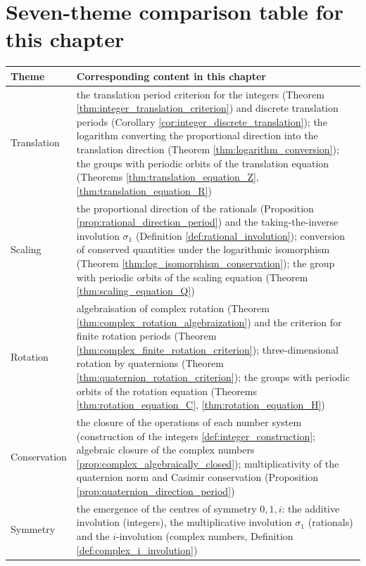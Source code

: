 \section*{Seven-theme comparison table for this chapter}

\begingroup
\renewcommand{\arraystretch}{1.3}
\begin{longtable}{>{\raggedright\arraybackslash}p{3cm}>{\raggedright\arraybackslash}p{10.5cm}}
\toprule
Theme & Corresponding content in this chapter \\
\midrule
Translation & the translation period criterion for the integers (Theorem \ref{thm:integer_translation_criterion}) and discrete translation periods (Corollary \ref{cor:integer_discrete_translation}); the logarithm converting the proportional direction into the translation direction (Theorem \ref{thm:logarithm_conversion}); the groups with periodic orbits of the translation equation (Theorems \ref{thm:translation_equation_Z}, \ref{thm:translation_equation_R}) \\
Scaling & the proportional direction of the rationals (Proposition \ref{prop:rational_direction_period}) and the taking-the-inverse involution $\sigma_1$ (Definition \ref{def:rational_involution}); conversion of conserved quantities under the logarithmic isomorphism (Theorem \ref{thm:log_isomorphism_conservation}); the group with periodic orbits of the scaling equation (Theorem \ref{thm:scaling_equation_Q}) \\
Rotation & algebraisation of complex rotation (Theorem \ref{thm:complex_rotation_algebraization}) and the criterion for finite rotation periods (Theorem \ref{thm:complex_finite_rotation_criterion}); three-dimensional rotation by quaternions (Theorem \ref{thm:quaternion_rotation_criterion}); the groups with periodic orbits of the rotation equation (Theorems \ref{thm:rotation_equation_C}, \ref{thm:rotation_equation_H}) \\
Conservation & the closure of the operations of each number system (construction of the integers \ref{def:integer_construction}; algebraic closure of the complex numbers \ref{prop:complex_algebraically_closed}); multiplicativity of the quaternion norm and Casimir conservation (Proposition \ref{prop:quaternion_direction_period}) \\
Symmetry & the emergence of the centres of symmetry $0,1,i$: the additive involution (integers), the multiplicative involution $\sigma_1$ (rationals) and the $i$-involution (complex numbers, Definition \ref{def:complex_i_involution}) \\

\end{longtable}
